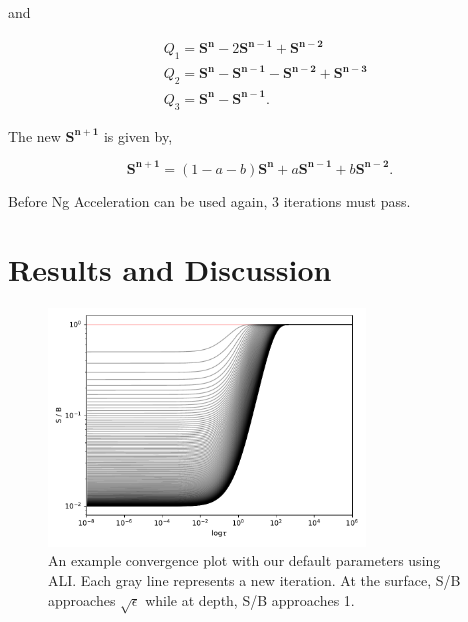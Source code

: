 \documentclass[12pt]{article}
\begin{document}
and 

\begin{equation}
    \begin{split}
        & Q_{1} = \mathbf{S^{n}}-2\mathbf{S^{n-1}}+\mathbf{S^{n-2}}\\
        & Q_{2} = \mathbf{S^{n}}-\mathbf{S^{n-1}}-\mathbf{S^{n-2}}+\mathbf{S^{n-3}}\\
        & Q_{3} = \mathbf{S^{n}}-\mathbf{S^{n-1}}.
    \end{split}
\end{equation}

The new $\mathbf{S^{n+1}}$ is given by,

\begin{equation}
    \mathbf{S^{n+1}} = (1-a-b)\mathbf{S^{n}} + a\mathbf{S^{n-1}} + b\mathbf{S^{n-2}}.
\end{equation}

Before Ng Acceleration can be used again, 3 iterations must pass.


\section{Results and Discussion}

\begin{figure}[ht]
 \centering
 \includegraphics[width=0.75\textwidth]{S_B_convergence.pdf}
 \caption{An example convergence plot with our default parameters using ALI. Each gray line represents a new iteration. At the surface, S/B approaches $\sqrt\epsilon$ while at depth, S/B approaches 1.}
\end{figure}
\end{document}
